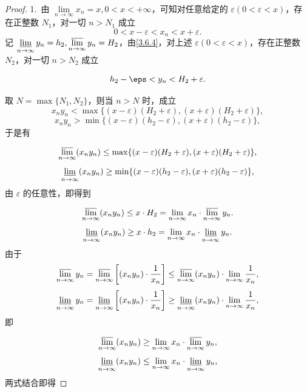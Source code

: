 \begin{proof}
	1.~由 \(\lim\limits_{n \to \infty} x_n = x, 0 < x < +\infty\)，可知对任意给定的 \(\varepsilon (0 < \varepsilon < x)\)，存在正整数 \(N_1\)，对一切 \(n > N_1\) 成立
	\[
	0 < x - \varepsilon < x_n < x + \varepsilon.
	\]
	记 \(\varliminf\limits_{n \to \infty} y_n = h_2,\varlimsup\limits_{n \to \infty} y_n = H_2\)，由\ref{3.6.4}，对上述 \(\varepsilon (0 < \varepsilon < x)\)，存在正整数 \(N_2\)，对一切 \(n > N_2\) 成立
	
	\[
	h_2-\eps <y_n < H_2 + \varepsilon.
	\]
	
	取 \(N = \max \{N_1, N_2\}\)，则当 \(n > N\) 时，成立
	\[
	x_n y_n < \max \{ (x - \varepsilon) (H_2 + \varepsilon), (x + \varepsilon) (H_2 + \varepsilon) \},
	\]
	\[
	x_n y_n > \min \{ (x - \varepsilon) (h_2 - \varepsilon), (x + \varepsilon) (h_2 - \varepsilon) \},
	\]
	于是有
	
	\[
	\varlimsup\limits_{n \to \infty} (x_n y_n) \leq \max \{ (x - \varepsilon) (H_2 + \varepsilon), (x + \varepsilon) (H_2 + \varepsilon) \},
	\]
	\[
	\varliminf\limits_{n \to \infty} (x_n y_n) \geq  \min \{ (x - \varepsilon) (h_2 - \varepsilon), (x + \varepsilon) (h_2 - \varepsilon) \},
	\]
	由 \(\varepsilon\) 的任意性，即得到
	
	\[
	\varlimsup\limits_{n \to \infty} (x_n y_n) \leq x \cdot H_2 = \lim_{n \to \infty} x_n \cdot \varlimsup\limits_{n \to \infty} y_n.
	\]
	\[
	\varliminf\limits_{n \to \infty} (x_n y_n) \geq x \cdot h_2 = \lim_{n \to \infty} x_n \cdot \varliminf\limits_{n \to \infty} y_n.
	\]
	由于
	\[
	\varlimsup\limits_{n \to \infty} y_n = \varlimsup\limits_{n \to \infty} \left[ (x_n y_n) \cdot \frac{1}{x_n} \right] \leq \varlimsup\limits_{n \to \infty} (x_n y_n) \cdot \lim_{n \to \infty} \frac{1}{x_n},
	\]
	\[
	\varliminf\limits_{n \to \infty} y_n = \varliminf\limits_{n \to \infty} \left[ (x_n y_n) \cdot \frac{1}{x_n} \right] \geq \varliminf\limits_{n \to \infty} (x_n y_n) \cdot \lim_{n \to \infty} \frac{1}{x_n},
	\]
	即
	
	\[
	\varlimsup\limits_{n \to \infty} (x_n y_n) \geq \lim_{n \to \infty} x_n \cdot \varlimsup\limits_{n \to \infty} y_n,
	\]
	\[
	\varliminf\limits_{n \to \infty} (x_n y_n) \leq \lim_{n \to \infty} x_n \cdot \varliminf\limits_{n \to \infty} y_n,
	\]
	两式结合即得
	

\end{proof}

